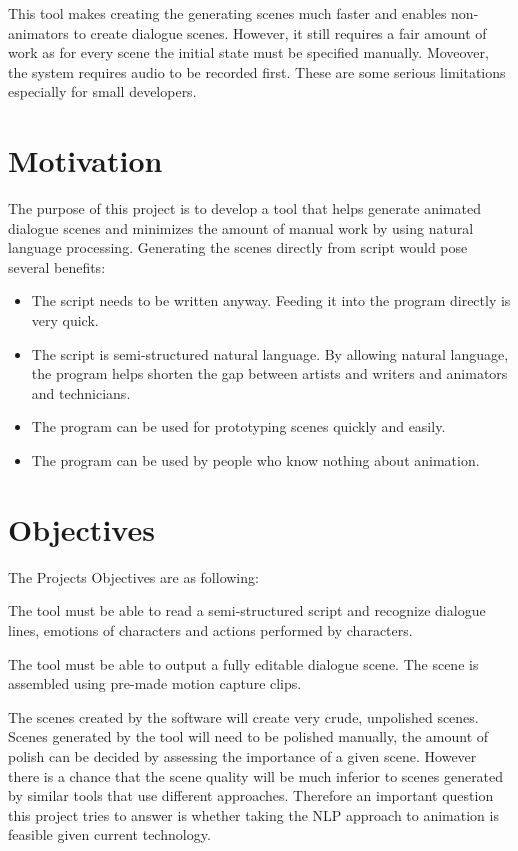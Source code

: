 This tool makes creating the generating scenes much faster and enables non-animators to create dialogue scenes. However, it still requires a fair amount of work as for every scene the initial state must be specified manually. Moveover, the system requires audio to be recorded first. These are some serious limitations especially for small developers.

\section{Motivation}

The purpose of this project is to develop a tool that helps generate animated dialogue scenes and minimizes the amount of manual work by using natural language processing. Generating the scenes directly from script would pose several benefits:

\begin{itemize}
\item The script needs to be written anyway. Feeding it into the program directly is very quick.
\item The script is semi-structured natural language. By allowing natural language, the program helps shorten the gap between artists and writers and animators and technicians.
\item The program can be used for prototyping scenes quickly and easily.
\item The program can be used by people who know nothing about animation.
\end{itemize}

\section{Objectives}

The Projects Objectives are as following:


\noindent The tool must be able to read a semi-structured script and recognize dialogue lines, emotions of characters and actions performed by characters.


\noindent The tool must be able to output a fully editable dialogue scene. The scene is assembled using pre-made motion capture clips.

\bigskip
The scenes created by the software will create very crude, unpolished scenes. Scenes generated by the tool will need to be polished manually, the amount of polish can be decided by assessing the importance of a given scene. However there is a chance that the scene quality will be much inferior to scenes generated by similar tools that use different approaches. Therefore an important question this project tries to answer is whether taking the NLP approach to animation is feasible given current technology.



